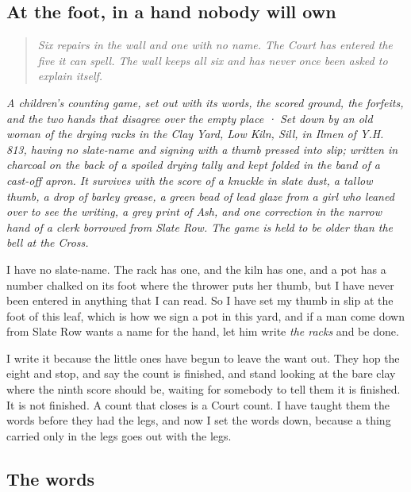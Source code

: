 \documentclass{design/chronicle}
\begin{document}
\subsection*{At the foot, in a hand nobody will own}

\begin{quote}\itshape Six repairs in the wall and one with no name. The Court has entered the five it can spell. The wall keeps all six and has never once been asked to explain itself.\end{quote}

\clearpage{}
{\centering\FellFont\itshape\footnotesize\color{faded} A children’s counting game, set out with its words, the scored ground, the forfeits, and the two hands that disagree over the empty place · Set down by an old woman of the drying racks in the Clay Yard, Low Kiln, Sill, in Ilmen of Y.H. 813, having no slate-name and signing with a thumb pressed into slip; written in charcoal on the back of a spoiled drying tally and kept folded in the band of a cast-off apron. It survives with the score of a knuckle in slate dust, a tallow thumb, a drop of barley grease, a green bead of lead glaze from a girl who leaned over to see the writing, a grey print of Ash, and one correction in the narrow hand of a clerk borrowed from Slate Row. The game is held to be older than the bell at the Cross.\par}\medskip
I have no slate-name. The rack has one, and the kiln has one, and a pot has a number chalked on its foot where the thrower puts her thumb, but I have never been entered in anything that I can read. So I have set my thumb in slip at the foot of this leaf, which is how we sign a pot in this yard, and if a man come down from Slate Row wants a name for the hand, let him write \emph{the racks} and be done.

I write it because the little ones have begun to leave the want out. They hop the eight and stop, and say the count is finished, and stand looking at the bare clay where the ninth score should be, waiting for somebody to tell them it is finished. It is not finished. A count that closes is a Court count. I have taught them the words before they had the legs, and now I set the words down, because a thing carried only in the legs goes out with the legs.

\subsection*{The words}
\end{document}
